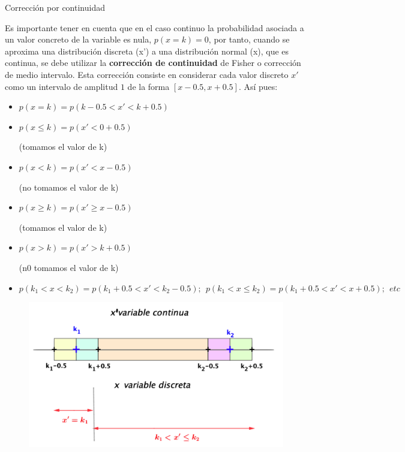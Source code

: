 \vspace{4mm} %
\begin{myalertblock}{Corrección por continuidad}
	
Es importante tener en cuenta que en el caso continuo la probabilidad asociada a un valor concreto de la variable es nula, 
$p(x=k)=0$, por tanto, cuando se aproxima una distribución discreta (x') a una distribución normal (x), 
que es continua, se debe utilizar la \textbf{corrección de continuidad} de Fisher o corrección de medio intervalo. 
Esta corrección consiste en considerar cada valor discreto $x'$ como un intervalo de amplitud $1$ de la forma $[x-0.5,x+0.5]$. Así pues:


\begin{itemize}
\item $p(x=k)=p(k-0.5<x'<k+0.5)$  
\item $p(x\le k)=p(x'<0+0.5)$ \begin{footnotesize} (tomamos el valor de k) \end{footnotesize} 
\item $p(x<k)=p(x'<x-0.5)$ \begin{footnotesize} (no tomamos el valor de k) \end{footnotesize}
\item $p(x\ge k)=p(x'\ge x-0.5)$	 \begin{footnotesize} (tomamos el valor de k) \end{footnotesize}
\item $p(x>k)=p(x'>k+0.5)$ \begin{footnotesize} (n0 tomamos el valor de k) \end{footnotesize}

\item  \begin{footnotesize} $p(k_1 < x < k_2)=p(k_1 + 0.5< x' < k_2-0.5); \ \ p(k_1< x \le k_2)= p(k_1+0.5 < x'<x+0.5);\ \ etc$ \end{footnotesize}
\end{itemize}

	\begin{figure}[H]
	\centering
	\includegraphics[width=.9\textwidth]{imagenes/imagenes04/T04IM35.png}
	\end{figure}
	
\end{myalertblock}

